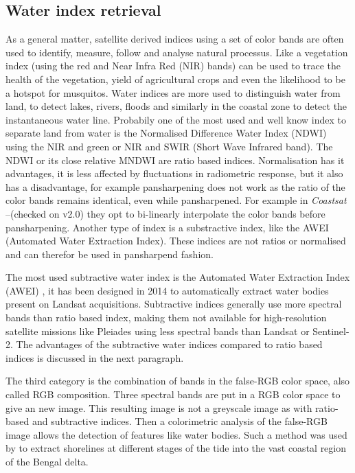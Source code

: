 \documentclass[remotesensing,article,submit,pdftex,moreauthors]{Definitions/mdpi}
\begin{document}
\subsection{Water index retrieval}
As a general matter, satellite derived indices using a set of color bands are often used to identify, measure, follow and analyse natural processus. Like a vegetation index (using the red and Near Infra Red (NIR) bands) can be used to trace the health of the vegetation, yield of agricultural crops and even the likelihood to be a hotspot for musquitos. Water indices are more used to distinguish water from land, to detect lakes, rivers, floods and similarly in the coastal zone to detect the instantaneous water line. Probabily one of the most used and well know index to separate land from water is the Normalised Difference Water Index (NDWI) using the NIR and green or NIR and SWIR (Short Wave Infrared band). The NDWI or its close relative MNDWI are ratio based indices. Normalisation has it advantages, it is less affected by fluctuations in radiometric response, but it also has a disadvantage, for example pansharpening does not work as the ratio of the color bands remains identical, even while pansharpened. For example in \textit{Coastsat} --(checked on v2.0) they opt to bi-linearly interpolate the color bands before pansharpening. Another type of index is a substractive index, like the AWEI (Automated Water Extraction Index). These indices are not ratios or normalised and can therefor be used in pansharpend fashion. 




The most used subtractive water index is the Automated Water Extraction Index (AWEI) \citep{FEYISA201423}, it has been designed in 2014 to automatically extract water bodies present on Landsat acquisitions.
Subtractive indices generally use more spectral bands than ratio based index, making them not available for high-resolution satellite missions like Pleiades using less spectral bands than Landsat or Sentinel-2.
The advantages of the subtractive water indices compared to ratio based indices is discussed in the next paragraph.








The third category is the combination of bands in the false-RGB color space, also called RGB composition.
Three spectral bands are put in a RGB color space to give an new image.
This resulting image is not a greyscale image as with ratio-based and subtractive indices.
Then a colorimetric analysis of the false-RGB image allows the detection of features like water bodies.\citep{PEKEL2014704}
Such a method was used by \citep{Khan2019} to extract shorelines at different stages of the tide into the vast coastal region of the Bengal delta. %
\par
\end{document}
